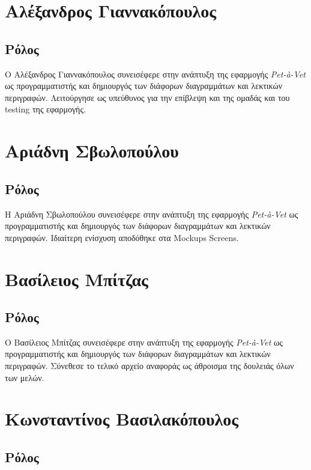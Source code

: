 \documentclass[12pt,a4paper,twoside]{book}
\begin{document}
\section{Αλέξανδρος Γιαννακόπουλος} %

\subsection{Ρόλος}

Ο Αλέξανδρος Γιαννακόπουλος συνεισέφερε στην ανάπτυξη της εφαρμογής \textit{Pet-à-Vet} ως προγραμματιστής και δημιουργός των διάφορων διαγραμμάτων και λεκτικών περιγραφών. Λειτούργησε ως υπεύθυνος για την επίβλεψη και της ομαδάς και του testing της εφαρμογής. %

\section{Αριάδνη Σβωλοπούλου} %

\subsection{Ρόλος}

Η Αριάδνη Σβωλοπούλου συνεισέφερε στην ανάπτυξη της εφαρμογής \textit{Pet-à-Vet} ως προγραμματιστής και δημιουργός των διάφορων διαγραμμάτων και λεκτικών περιγραφών. Ιδιαίτερη ενίσχυση αποδόθηκε στα Mockups Screens. %

\section{Βασίλειος Μπίτζας}

\subsection{Ρόλος}

Ο Βασίλειος Μπίτζας συνεισέφερε στην ανάπτυξη της εφαρμογής \textit{Pet-à-Vet} ως προγραμματιστής και δημιουργός των διάφορων διαγραμμάτων και λεκτικών περιγραφών. Σύνεθεσε το τελικό αρχείο αναφοράς ως άθροισμα της δουλειάς όλων των μελών. %

\section{Κωνσταντίνος Βασιλακόπουλος}

\subsection{Ρόλος}
\end{document}
